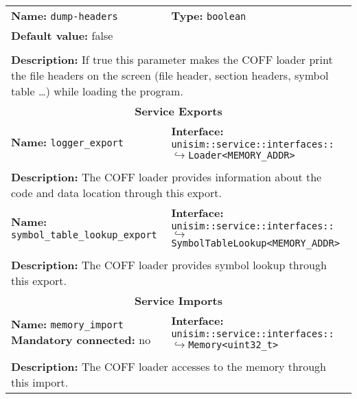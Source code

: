 \begin{center}
\begin{tabular}{|p{7.5cm}|p{7.5cm}|}
		\hline
		\hline
		\multicolumn{1}{|p{7.5cm}}{\textbf{Name:} \texttt{dump-headers}} & \multicolumn{1}{p{7.5cm}|}{\textbf{Type:} \texttt{boolean}}\\
		\multicolumn{2}{|p{15cm}|}{\textbf{Default value:} false}\\
		\multicolumn{2}{|l|}{}\\
		\multicolumn{2}{|p{15cm}|}{\textbf{Description:} \newline If true this parameter makes the COFF loader print the file headers on the screen (file header, section headers, symbol table \ldots) while loading the program.}\\
		\hline
		\hline
		\multicolumn{2}{|c|}{\textbf{\large Service Exports}}\\
		\hline
		\multicolumn{1}{|p{7.5cm}}{\textbf{Name:} \texttt{logger\_export}} & \multicolumn{1}{p{7.5cm}|}{\textbf{Interface:} \newline \texttt{unisim::service::interfaces::} \newline$\hookrightarrow$\texttt{Loader<MEMORY\_ADDR>}}\\
		\multicolumn{2}{|l|}{}\\
		\multicolumn{2}{|p{15cm}|}{\textbf{Description:} \newline The COFF loader provides information about the code and data location through this export.}\\
		\hline
		\multicolumn{1}{|p{7.5cm}}{\textbf{Name:} \texttt{symbol\_table\_lookup\_export}} & \multicolumn{1}{p{7.5cm}|}{\textbf{Interface:} \newline \texttt{unisim::service::interfaces::} \newline$\hookrightarrow$\texttt{SymbolTableLookup<MEMORY\_ADDR>}}\\
		\multicolumn{2}{|l|}{}\\
		\multicolumn{2}{|p{15cm}|}{\textbf{Description:} \newline The COFF loader provides symbol lookup through this export.}\\
		\hline
		\hline
		\multicolumn{2}{|c|}{\textbf{\large Service Imports}}\\
		\hline
		\multicolumn{1}{|p{7.5cm}}{\textbf{Name:} \texttt{memory\_import} \newline \textbf{Mandatory connected:} no} & \multicolumn{1}{p{7.5cm}|}{\textbf{Interface:} \newline \texttt{unisim::service::interfaces::} \newline$\hookrightarrow$\texttt{Memory<uint32\_t>}}\\
		\multicolumn{2}{|l|}{}\\
		\multicolumn{2}{|p{15cm}|}{\textbf{Description:} \newline The COFF loader accesses to the memory through this import.}\\
		\hline
	\end{tabular}
\end{center}

